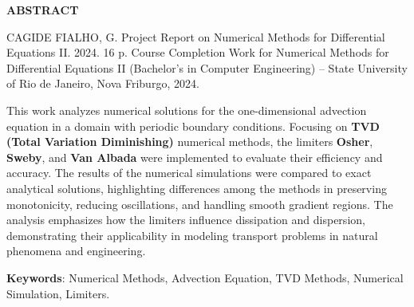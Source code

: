 \begin{titlepage}
    \thispagestyle{empty} %

    \begin{center}
        \textbf{\Large ABSTRACT}
    \end{center}

    \vspace{1cm} %

    \noindent CAGIDE FIALHO, G. Project Report on Numerical Methods for Differential Equations II. 2024. 16 p. Course Completion Work for Numerical Methods for Differential Equations II (Bachelor’s in Computer Engineering) – State University of Rio de Janeiro, Nova Friburgo, 2024.

    \vspace{0.4cm} %

    This work analyzes numerical solutions for the one-dimensional advection equation in a domain with periodic boundary conditions. Focusing on \textbf{TVD (Total Variation Diminishing)} numerical methods, the limiters \textbf{Osher}, \textbf{Sweby}, and \textbf{Van Albada} were implemented to evaluate their efficiency and accuracy. The results of the numerical simulations were compared to exact analytical solutions, highlighting differences among the methods in preserving monotonicity, reducing oscillations, and handling smooth gradient regions. The analysis emphasizes how the limiters influence dissipation and dispersion, demonstrating their applicability in modeling transport problems in natural phenomena and engineering.

    \vspace{0.4cm} %

    \textbf{Keywords}: Numerical Methods, Advection Equation, TVD Methods, Numerical Simulation, Limiters.
\end{titlepage}

